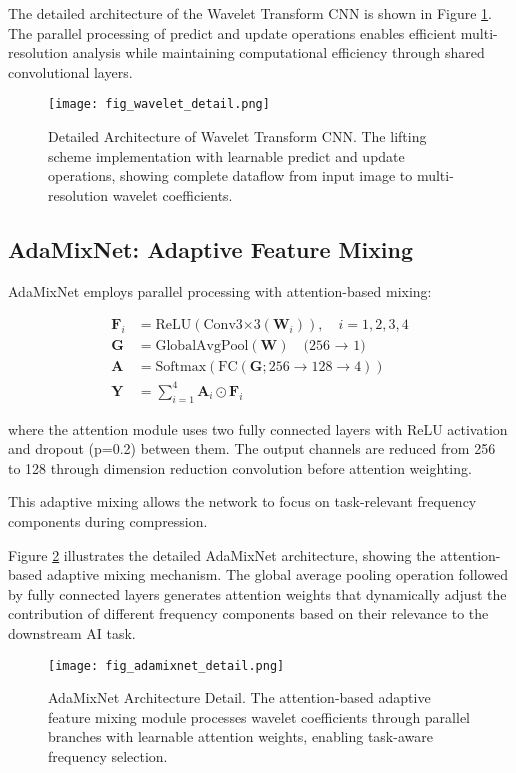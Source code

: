 \documentclass[conference]{IEEEtran}
\begin{document}
The detailed architecture of the Wavelet Transform CNN is shown in Figure \ref{fig:wavelet_detail}. The parallel processing of predict and update operations enables efficient multi-resolution analysis while maintaining computational efficiency through shared convolutional layers.

\begin{figure}[htbp]
\centering
\texttt{[image: fig\_wavelet\_detail.png]}
\caption{Detailed Architecture of Wavelet Transform CNN. The lifting scheme implementation with learnable predict and update operations, showing complete dataflow from input image to multi-resolution wavelet coefficients.}
\label{fig:wavelet_detail}
\end{figure}

\subsection{AdaMixNet: Adaptive Feature Mixing}

AdaMixNet employs parallel processing with attention-based mixing:

\begin{align}
\mathbf{F}_i &= \text{ReLU}(\text{Conv3×3}(\mathbf{W}_i)), \quad i = 1, 2, 3, 4 \\
\mathbf{G} &= \text{GlobalAvgPool}(\mathbf{W}) \quad \text{(256 → 1)} \\
\mathbf{A} &= \text{Softmax}(\text{FC}(\mathbf{G}; 256 \to 128 \to 4)) \\
\mathbf{Y} &= \sum_{i=1}^{4} \mathbf{A}_i \odot \mathbf{F}_i
\end{align}

where the attention module uses two fully connected layers with ReLU activation and dropout (p=0.2) between them. The output channels are reduced from 256 to 128 through dimension reduction convolution before attention weighting.

This adaptive mixing allows the network to focus on task-relevant frequency components during compression.

Figure \ref{fig:adamixnet_detail} illustrates the detailed AdaMixNet architecture, showing the attention-based adaptive mixing mechanism. The global average pooling operation followed by fully connected layers generates attention weights that dynamically adjust the contribution of different frequency components based on their relevance to the downstream AI task.

\begin{figure}[htbp]
\centering
\texttt{[image: fig\_adamixnet\_detail.png]}
\caption{AdaMixNet Architecture Detail. The attention-based adaptive feature mixing module processes wavelet coefficients through parallel branches with learnable attention weights, enabling task-aware frequency selection.}
\label{fig:adamixnet_detail}
\end{figure}
\end{document}
